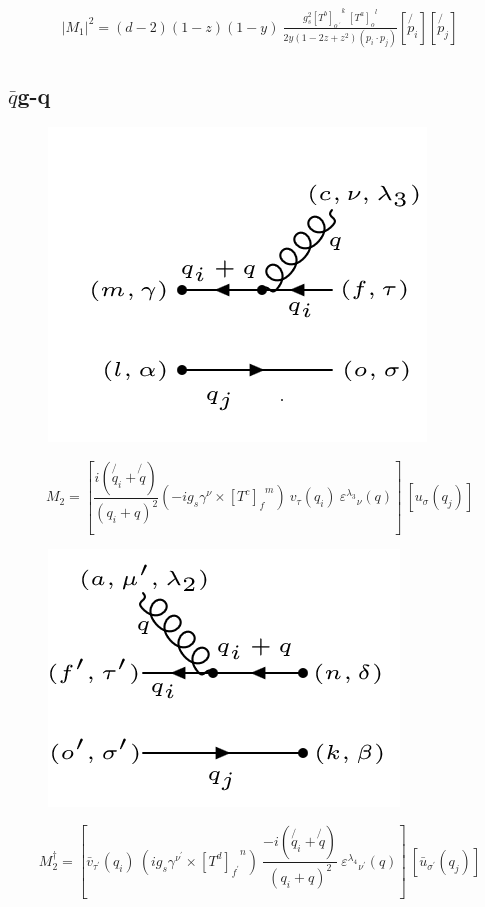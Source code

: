 \begin{equation}
\begin{split}
|M_1|^2=(d-2)(1-z)(1-y)\:\frac{g_s^2  {[T^b]_{o\:^{\prime}}}^k \: {[T^a]_o}^l }{2y(1-2z+z^2)(p_i \cdot p_j)}
[\not{p_i}][\not{p_j}]
\end{split}
\end{equation}
\newpage

\subsection{$\bar{q}$g-q}

\begin{figure}[h!]
\centering
\includegraphics[scale=0.7]{images/qbargqM.png}
\end{figure}

\begin{equation}
M_2 = [\frac{i(\not{q_i} + \not{q})}{(q_i + q)^2} (-ig_s \gamma^{\nu}\times {[T^c]_f}^m) \:{v}_{\tau}(q_i)\: {\varepsilon^{\lambda_3}}_{\nu} (q)]\: [{u}_{\sigma}(q_j)]
\end{equation}
\begin{figure}[h!]
\centering
\includegraphics[scale=0.7]{images/qbargqMDega.png}
\end{figure}
\begin{equation}
M_2^{\dagger} = [\bar{v}_{{\tau}^{\prime}}(q_i) \: (ig_s \gamma^{{\nu}^{\prime}}\times {[T^d]_{f^{\prime}}}^n) \: \frac{-i(\not{q_i} + \not{q})}{(q_i + q)^2} \: {\varepsilon^{\lambda_4}}_{{\nu}^{\prime}} (q)]\: [\bar{u}_{{\sigma}^{\prime}}(q_j)]
\end{equation}

